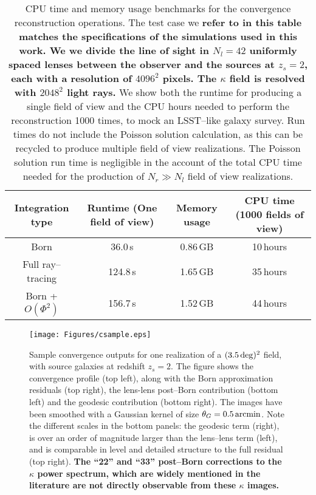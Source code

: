 \documentclass[reprint,aps,prd,superscriptaddress,showkeys,showpacs]{revtex4-1}
\begin{document}
\begin{table*}
\begin{center}

\begin{tabular}{c|c|c|c}

\textbf{Integration type} & \textbf{Runtime (One field of view)} & \textbf{Memory usage} & \textbf{CPU time (1000 fields of view)} \\ \hline \hline
Born & 36.0\,s & 0.86\,GB & 10\,hours  \\
Full ray--tracing & 124.8\,s & 1.65\,GB & 35\,hours  \\
Born + $O(\Phi^2)$ & 156.7\,s & 1.52\,GB & 44\,hours \\ \hline

\end{tabular}

\end{center}

\caption{CPU time and memory usage benchmarks for the convergence reconstruction operations. The test case we \textbf{\color{red} refer to in this table matches the specifications of the simulations used in this work. We we divide the line of sight in $N_l=42$ uniformly spaced lenses between the observer and the sources at $z_s=2$, each with a resolution of $4096^2$ pixels. The $\kappa$ field is resolved with $2048^2$ light rays.} We show both the runtime for producing a single field of view and the CPU hours needed to perform the reconstruction 1000 times, to mock an LSST--like galaxy survey. Run times do not include the Poisson solution calculation, as this can be recycled to produce multiple field of view realizations. The Poisson solution run time is negligible in the account of the total CPU time needed for the production of $N_r\gg N_l$ field of view realizations.}
\label{tab:benchmarks}

\end{table*}

\begin{figure*}
\begin{center}
\texttt{[image: Figures/csample.eps]}
\end{center}
\caption{Sample convergence outputs for one realization of a $(3.5\,{\rm deg})^2$ field, with source galaxies at redshift $z_s=2$. The figure shows the convergence profile (top left), along with the Born approximation residuals (top right), the lens-lens post--Born contribution (bottom left) and the geodesic contribution (bottom right). The images have been smoothed with a Gaussian kernel of size $\theta_G=0.5\,{\rm arcmin}$.  Note the different scales in the bottom panels: the geodesic term (right), is over an order of magnitude larger than the lens--lens term (left), and is comparable in level and detailed structure to the full residual (top right). \textbf{\color{blue} The ``22'' and ``33'' post--Born corrections to the $\kappa$ power spectrum, which are widely mentioned in the literature \citep{HirataKrause} are not directly observable from these $\kappa$ images.}} 
\label{fig:csample}
\end{figure*} 
\end{document}
